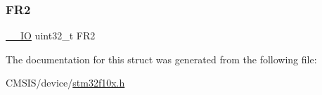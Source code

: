\mbox{\label{struct_c_a_n___filter_register___type_def_a7f7d80b45b7574463d7030fc8a464582}} 
\subsubsection{\texorpdfstring{FR2}{FR2}}
{\footnotesize\ttfamily \mbox{\hyperlink{core__sc300_8h_aec43007d9998a0a0e01faede4133d6be}{\+\_\+\+\_\+\+IO}} uint32\+\_\+t F\+R2}



The documentation for this struct was generated from the following file\+:\begin{DoxyCompactItemize}
\item 
C\+M\+S\+I\+S/device/\mbox{\hyperlink{stm32f10x_8h}{stm32f10x.\+h}}\end{DoxyCompactItemize}
